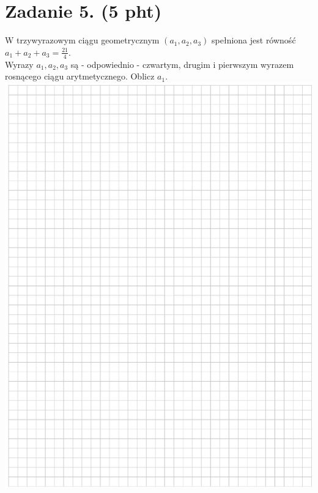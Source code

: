 \documentclass[10pt]{article}
\begin{document}
\section*{Zadanie 5. (5 pht)}
W trzywyrazowym ciągu geometrycznym \(\left(a_{1}, a_{2}, a_{3}\right)\) spełniona jest równość \(a_{1}+a_{2}+a_{3}=\frac{21}{4}\).\\
Wyrazy \(a_{1}, a_{2}, a_{3}\) są - odpowiednio - czwartym, drugim i pierwszym wyrazem rosnącego ciągu arytmetycznego. Oblicz \(a_{1}\).\\
\includegraphics[max width=\textwidth, center]{2024_11_21_ebf83f11df6f4915f701g-06}\\
\end{document}
